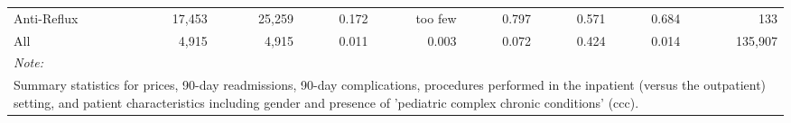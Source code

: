 \begin{table}[H]
\begin{tabular}{lrrrrrrrr}
\hspace{1em}Anti-Reflux & 17,453 & 25,259 & 0.172 & too few & 0.797 & 0.571 & 0.684 & 133\\
\hspace{1em}All & 4,915 & 4,915 & 0.011 & 0.003 & 0.072 & 0.424 & 0.014 & 135,907\\
\bottomrule
\multicolumn{9}{l}{\rule{0pt}{1em}\textit{Note: }}\\
\multicolumn{9}{l}{\rule{0pt}{1em}Summary statistics for prices, 90-day readmissions, 90-day complications, procedures performed in the inpatient (versus the outpatient) setting, and patient characteristics including gender and presence of 'pediatric complex chronic conditions' (ccc).}\\
\end{tabular}
\end{table}
